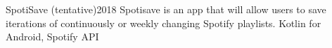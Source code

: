 %
%
%


\begin{projects}
	\project
	{SpotiSave (tentative)}{2018}{}
	{Spotisave is an app that will allow users to save iterations of continuously or weekly changing Spotify playlists.}
	{Kotlin for Android, Spotify API}
\end{projects}